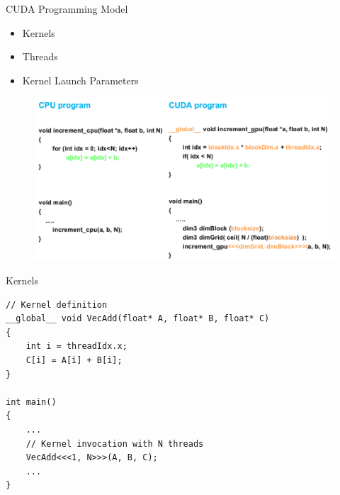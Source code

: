 \begin{frame}{CUDA Programming Model}
    \begin{block}{}
        \begin{itemize}
            \item Kernels
            \item Threads
            \item Kernel Launch Parameters
        \end{itemize}
        \begin{center}
            \begin{figure}[H]
                \includegraphics[scale=0.3]{figures/CPUvsGPUprogram.png}
            \end{figure}
        \end{center}
    \end{block}
\end{frame}

\begin{frame}[fragile]{Kernels}
	\begin{block}{}
        \begin{verbatim}
// Kernel definition
__global__ void VecAdd(float* A, float* B, float* C)
{
    int i = threadIdx.x;
    C[i] = A[i] + B[i];
}

int main()
{
    ...
    // Kernel invocation with N threads
    VecAdd<<<1, N>>>(A, B, C);
    ...
}
        \end{verbatim}
    \end{block}            
\end{frame}

